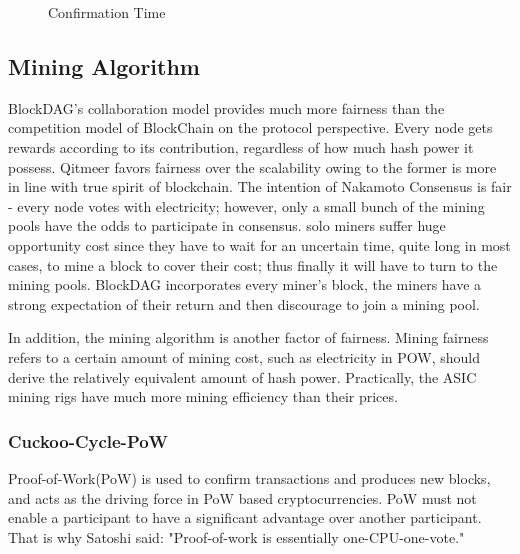 \documentclass[a4paper,11pt]{article}
\begin{document}
\begin{figure}[ht]
	\centerline{%
	}
\caption{Confirmation Time}
\end{figure}


\subsection{Mining Algorithm}
BlockDAG’s collaboration model provides much more fairness than the competition model of BlockChain on the protocol perspective. Every node gets rewards according to its contribution, regardless of how much hash power it possess. Qitmeer favors fairness over the scalability owing to the former is more in line with true spirit of blockchain. The intention of Nakamoto Consensus is fair - every node votes with electricity; however, only a small bunch of the mining pools have the odds to participate in consensus. solo miners suffer huge opportunity cost since they have to wait for an uncertain time, quite long in most cases, to mine a block to cover their cost; thus finally it will have to turn to the mining pools. BlockDAG incorporates every miner’s block, the miners have a strong expectation of their return and then discourage to join a mining pool.


In addition, the mining algorithm is  another factor of fairness. Mining fairness refers to a certain amount of mining cost, such as electricity in POW, should derive the relatively equivalent amount of hash power. Practically, the ASIC mining rigs have much more mining efficiency than their prices.

\subsubsection{Cuckoo-Cycle-PoW}
Proof-of-Work(PoW) is used to confirm transactions and produces new blocks, and acts as the driving force in PoW based cryptocurrencies. PoW must not enable a participant to have a significant advantage over another participant. That is why Satoshi said: "Proof-of-work is essentially one-CPU-one-vote."
\end{document}

